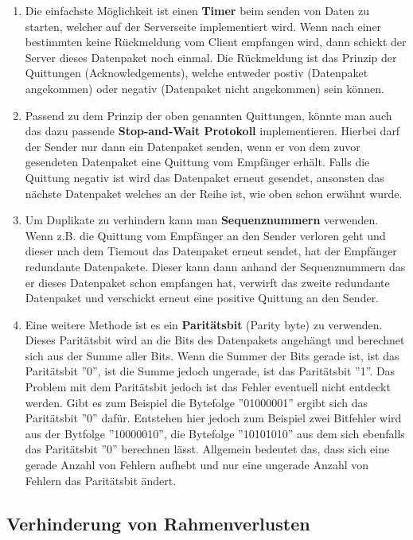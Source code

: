 \documentclass{scrartcl}
\begin{document}
    \begin{enumerate}
    \item Die einfachste Möglichkeit ist einen \textbf{Timer} beim senden von Daten zu starten, welcher auf der Serverseite implementiert wird. Wenn nach einer bestimmten keine Rückmeldung vom Client empfangen wird, dann schickt der Server dieses Datenpaket noch einmal. Die Rückmeldung ist das Prinzip der Quittungen (Acknowledgements), welche entweder postiv (Datenpaket angekommen) oder negativ (Datenpaket nicht angekommen) sein können.
    \item Passend zu dem Prinzip der oben genannten Quittungen, könnte man auch das dazu passende \textbf{Stop-and-Wait Protokoll} implementieren. Hierbei darf der Sender nur dann ein Datenpaket senden, wenn er von dem zuvor gesendeten Datenpaket eine Quittung vom Empfänger erhält. Falls die Quittung negativ ist wird das Datenpaket erneut gesendet, ansonsten das nächste Datenpaket welches an der Reihe ist, wie oben schon erwähnt wurde.
    \item Um Duplikate zu verhindern kann man \textbf{Sequenznummern} verwenden. Wenn z.B. die Quittung vom Empfänger an den Sender verloren geht und dieser nach dem Tiemout das Datenpaket erneut sendet, hat der Empfänger redundante Datenpakete. Dieser kann dann anhand der Sequenznummern das er dieses Datenpaket schon empfangen hat, verwirft das zweite redundante Datenpaket und verschickt erneut eine positive Quittung an den Sender. 
    \item Eine weitere Methode ist es ein \textbf{Paritätsbit} (Parity byte) zu verwenden. Dieses Paritätsbit wird an die Bits des Datenpakets angehängt und berechnet sich aus der Summe aller Bits. Wenn die Summer der Bits gerade ist, ist das Paritätsbit ''0'', ist die Summe jedoch ungerade, ist das Paritätsbit ''1''. Das Problem mit dem Paritätsbit jedoch ist das Fehler eventuell nicht entdeckt werden. Gibt es zum Beispiel die Bytefolge ''01000001'' ergibt sich das Paritätsbit ''0'' dafür. Entstehen hier jedoch zum Beispiel zwei Bitfehler wird aus der Bytfolge ''10000010'', die Bytefolge ''10101010'' aus dem sich ebenfalls das Paritätsbit ''0'' berechnen lässt. Allgemein bedeutet das, dass sich eine gerade Anzahl von Fehlern aufhebt und nur eine ungerade Anzahl von Fehlern das Paritätsbit ändert. 
  \end{enumerate}
  
  \subsection[Aufgabe 6 Verhinderung von Rahmenverlusten]{Verhinderung von Rahmenverlusten}
  
\end{document}
